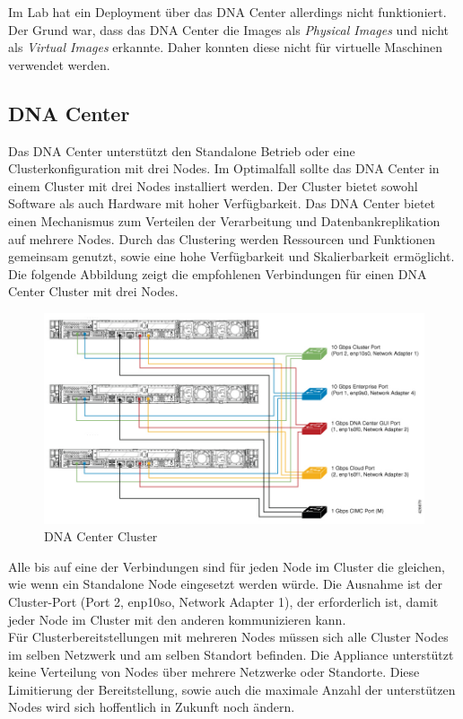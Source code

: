 Im Lab hat ein Deployment über das DNA Center allerdings nicht funktioniert. Der Grund war, dass das DNA Center die Images als \textit{Physical Images} und nicht als \textit{Virtual Images} erkannte. Daher konnten diese nicht für virtuelle Maschinen verwendet werden.

\subsection{DNA Center}
Das DNA Center unterstützt den Standalone Betrieb oder eine Clusterkonfiguration mit drei Nodes. Im Optimalfall sollte das DNA Center in einem Cluster mit drei Nodes installiert werden. Der Cluster bietet sowohl Software als auch Hardware mit hoher Verfügbarkeit. Das DNA Center bietet einen Mechanismus zum Verteilen der Verarbeitung und Datenbankreplikation auf mehrere Nodes. Durch das Clustering werden Ressourcen und Funktionen gemeinsam genutzt, sowie eine hohe Verfügbarkeit und Skalierbarkeit ermöglicht. \\

Die folgende Abbildung zeigt die empfohlenen Verbindungen für einen DNA Center Cluster mit drei Nodes. 
\begin{figure}[H]
	\centering
	\includegraphics[width=0.8\linewidth]{img/Absicherung/DNAC-Cluster}
	\caption{DNA Center Cluster \cite{dnac-cluster} }
	\label{fig:DNA Center Cluster}
\end{figure}
Alle bis auf eine der Verbindungen sind für jeden Node im Cluster die gleichen, wie wenn ein Standalone Node eingesetzt werden würde. Die Ausnahme ist der Cluster-Port (Port 2, enp10so, Network Adapter 1), der erforderlich ist, damit jeder Node im Cluster mit den anderen kommunizieren kann. \\

Für Clusterbereitstellungen mit mehreren Nodes müssen sich alle Cluster Nodes im selben Netzwerk und am selben Standort befinden. Die Appliance unterstützt keine Verteilung von Nodes über mehrere Netzwerke oder Standorte. Diese Limitierung der Bereitstellung, sowie auch die maximale Anzahl der unterstützen Nodes wird sich hoffentlich in Zukunft noch ändern.

